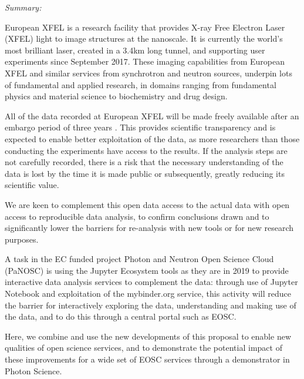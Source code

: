 \begin{task}[
  title=Reproducible X-ray crystallography workflows at European XFEL,
  id=reproducibility-xfel,
  lead=XFEL,
  PM=36,
  wphases={6-48},
  partners={XFEL}
  ]

\emph{Summary:}

  European XFEL is a research facility that provides X-ray Free
  Electron Laser (XFEL) light to image structures at the nanoscale. It
  is currently the world's most brilliant laser, created in a 3.4km
  long tunnel, and supporting user experiments since September
  2017. These imaging capabilities from European XFEL and similar
  services from synchrotron and neutron sources, underpin lots of
  fundamental and applied research, in domains ranging from fundamental
  physics and material science to biochemistry and drug design.

  All of the data recorded at European XFEL will be made freely
  available after an embargo period of three years
  \cite{EuXFEL-datapolicy-2017}. This provides scientific transparency
  and is expected to enable better exploitation of the data, as more
  researchers than those conducting the experiments have access to the
  results. If the analysis steps are not carefully recorded, there is a risk
  that the necessary understanding of the data is lost by the time it
  is made public or subsequently, greatly reducing its scientific
  value.

  We are keen to complement this open data access to the actual data
  with open access to reproducible data analysis, to confirm
  conclusions drawn and to significantly lower the barriers for
  re-analysis with new tools or for new research purposes.

  A task in the EC funded project Photon and Neutron Open Science
  Cloud (PaNOSC) is using the Jupyter Ecosystem tools as they are in
  2019 to provide interactive data analysis services to complement the
  data: through use of Jupyter Notebook and exploitation of the
  mybinder.org service, this activity will reduce the barrier for
  interactively exploring the data, understanding and making use of
  the data, and to do this through a central portal such as EOSC.

  Here, we combine and use the new developments of this
  proposal to enable new qualities of open science services, and to
  demonstrate the potential impact of these improvements for a wide
  set of EOSC services through a demonstrator in Photon Science.


\end{task}
